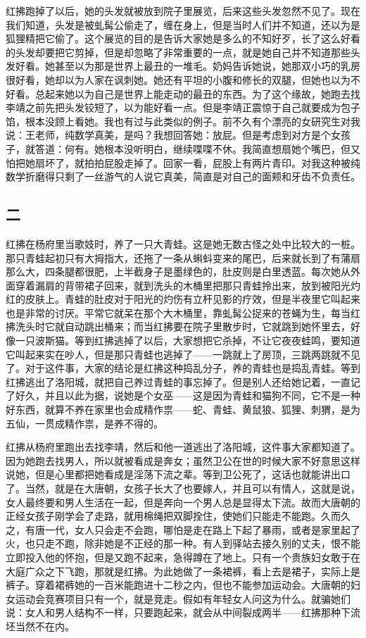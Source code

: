 红拂跑掉了以后，她的头发就被放到院子里展览，后来这些头发忽然不见了。现在我们知道，头发是被虬髯公偷走了，缠在身上，但是当时人们并不知道，还以为是狐狸精把它偷了。这个展览的目的是告诉大家她是多么的不知好歹，长了这么好看的头发却要把它剪掉，但是却忽略了非常重要的一点，就是她自己并不知道那些头发好看。她甚至以为那是世界上最丑的一堆毛。奶妈告诉她说，她那双小巧的乳房很好看，她却以为人家在讽刺她。她还有平坦的小腹和修长的双腿，但她也以为不好看。总起来她以为自己是世界上能走动的最丑的东西。为了这个缘故，她跑去找李靖之前先把头发铰短了，以为能好看一点。但是李靖正震惊于自己就要成为包子馅，根本没顾上看她。我也有过与此类似的例子。前不久有个漂亮的女研究生对我说：王老师，纯数学真美，是吗？我想回答她：放屁。但是考虑到对方是个女孩子，就答道：何有。她根本没听明白，继续喋喋不休。我简直想扇她个嘴巴，但又怕把她扇坏了，就拍拍屁股走掉了。回家一看，屁股上有两片青印。对我这种被纯数学折磨得只剩了一丝游气的人说它真美，简直是对自己的面颊和牙齿不负责任。 

\subsection{二} 

红拂在杨府里当歌妓时，养了一只大青蛙。这是她无数古怪之处中比较大的一桩。那只青蛙起初只有大拇指大，还拖了一条从蝌蚪变来的尾巴，后来就长到了有蒲扇那么大，四条腿都很肥，上半截身子是墨绿色的，肚皮则是白里透蓝。每次她从外面穿着漏肩的背带裙子回来，就到洗头的木桶里把那只青蛙拎出来，放到被阳光灼红的皮肤上。青蛙的肚皮对于阳光的灼伤有立杆见影的疗效，但是半夜里它叫起来也是非常的讨厌。平常它就呆在那个大木桶里，靠虬髯公捉来的苍蝇为生，每当红拂洗头时它就自动跳出桶来；而当红拂要在院子里散步时，它就跳到她怀里去，好像一只波斯猫。等到红拂逃掉了以后，大家想把它杀掉，不让它夜夜蛙鸣，要知道它叫起来实在吵人，但是那只青蛙也逃掉了——一跳就上了房顶，三跳两跳就不见了。对于这件事，大家的结论是红拂这种捣乱分子，养的青蛙也是捣乱青蛙。等到红拂逃出了洛阳城，就把自己养过青蛙的事忘掉了。但是别人还给她记着，一直记了好久，并且以此为据，说她是个女巫——这是因为青蛙和猫狗不同，它不是一种好东西，就算不养在家里也会成精作祟——蛇、青蛙、黄鼠狼、狐狸、刺猬，是为五仙，一贯成精作祟，是养不得的。 

红拂从杨府里跑出去找李靖，然后和他一道逃出了洛阳城，这件事大家都知道了。因为她跑去找男人，所以就被看成是奔女；虽然卫公在世的时候大家不好意思这样说她，但是心里都把她看成是淫荡下流之辈。等到卫公死了，这话也就能讲出口了。当然，就是在大唐朝，女孩子长大了也要嫁人，并且可以有情人，这就是说，女人最终要和男人生活在一起，但是奔向一个男人总是显得太下流。故而大唐朝的正经女孩子刚学会了走路，就用棉绳把双脚拴住，使她们只能走不能跑。久而久之，有唐一代，女人只会走不会跑，哪怕是走在路上下起了暴雨，或者是家里起了火，也只走不跑，除非她是不正经的那一种。有人到驿站去接久别的丈夫，恨不能立即投入他的怀抱，但是又跑不起来，急得蹲在了地上。只有一个贵族妇女敢于在大庭广众之下飞跑，那就是红拂。为此她做了一条裙裤，看上去是裙子，实际上是裤子。穿着裙裤她的一百米能跑进十二秒之内，但也不能参加运动会。大唐朝的妇女运动会竞赛项目只有一个，就是竞走。假如有年轻女人问这为什么。就骗她们说：女人和男人结构不一样，只要跑起来，就会从中间裂成两半——红拂那种下流坯当然不在内。 

